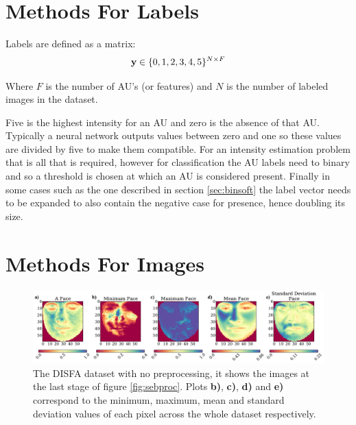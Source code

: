     \section{Methods For Labels}

      Labels are defined as a matrix:
      \begin{equation}
        {\bf y} \in \{0,1,2,3,4,5\}^{N\times F}
      \end{equation}

      Where $F$ is the number of AU's (or features) and $N$ is the number of labeled images
      in the dataset.

      Five is the highest intensity for an AU and zero is the absence of that AU.
      Typically a neural network outputs values between zero and one so these values are divided by five to make them compatible.
      For an intensity estimation problem that is all that is required, however for classification
      the AU labels need to binary and so a threshold is chosen at which an AU is considered present.
      Finally in some cases such as the one described in section \ref{sec:binsoft} the label vector
      needs to be expanded to also contain the negative case for presence, hence doubling its size.

  \section{Methods For Images} \label{sec:methods}

    \begin{figure}[!h] \centering
    \includegraphics[width =\hsize]{figures/faces.pdf}
    \caption{The DISFA dataset with no preprocessing, it shows
    the images at the last stage of figure \ref{fig:sebproc}. Plots {\bf b)}, {\bf c)}, {\bf d)}
    and {\bf e)}
    correspond to the minimum, maximum, mean and standard deviation values of each pixel across
    the whole dataset respectively.} \label{fig:faces_none} \end{figure}


